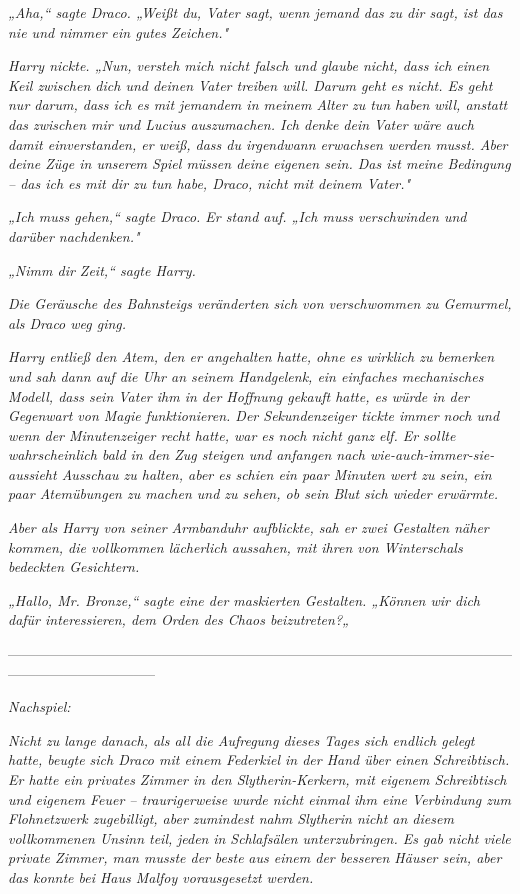 {\emph{„Aha,“ sagte Draco. „Weißt du, Vater sagt, wenn jemand das zu dir sagt, ist das nie und nimmer ein gutes Zeichen."}

\emph{Harry nickte. „Nun, versteh mich nicht falsch und glaube nicht, dass ich einen Keil zwischen dich und deinen Vater treiben will. Darum geht es nicht. Es geht nur darum, dass ich es mit jemandem in meinem Alter zu tun} \emph{haben will, anstatt das zwischen mir und Lucius auszumachen. Ich denke dein Vater wäre auch damit einverstanden, er weiß, dass du irgendwann erwachsen werden musst. Aber deine Züge in unserem Spiel müssen deine eigenen sein. Das ist meine Bedingung -- das ich es mit dir zu tun habe, Draco, nicht mit deinem Vater."}

\emph{„Ich muss gehen,“ sagte Draco. Er stand auf. „Ich muss verschwinden und darüber nachdenken."}

\emph{„Nimm dir Zeit,“ sagte Harry.}

\emph{Die Geräusche des Bahnsteigs veränderten sich von verschwommen zu Gemurmel, als Draco weg ging.}

\emph{Harry entließ den Atem, den er angehalten hatte, ohne es wirklich zu bemerken und sah dann auf die Uhr an seinem Handgelenk, ein einfaches mechanisches Modell, dass sein Vater ihm in der Hoffnung gekauft hatte, es würde in der Gegenwart von Magie funktionieren. Der Sekundenzeiger tickte immer noch und wenn der Minutenzeiger recht hatte, war es noch nicht ganz elf. Er sollte wahrscheinlich bald in den Zug steigen und anfangen nach wie-auch-immer-sie-aussieht Ausschau zu halten, aber es schien ein paar Minuten wert zu sein, ein paar Atemübungen zu machen und zu sehen, ob sein Blut sich wieder erwärmte.}

\emph{Aber als Harry von seiner Armbanduhr aufblickte, sah er zwei Gestalten näher kommen, die vollkommen lächerlich aussahen, mit ihren von Winterschals bedeckten Gesichtern.}

\emph{„Hallo, Mr. Bronze,“ sagte eine der maskierten Gestalten. „Können wir dich dafür interessieren, dem Orden des Chaos beizutreten?„}

--------------------------------------------------------------------------------------------------------------------------------------------

\hfill\break \emph{Nachspiel:}

\emph{Nicht zu lange danach, als all die Aufregung dieses Tages sich endlich gelegt hatte, beugte sich Draco mit einem Federkiel in der Hand über einen Schreibtisch. Er hatte ein privates Zimmer in den Slytherin-Kerkern, mit eigenem Schreibtisch und eigenem Feuer -- traurigerweise wurde nicht einmal ihm eine Verbindung zum Flohnetzwerk zugebilligt, aber zumindest nahm Slytherin nicht an diesem vollkommenen Unsinn teil,} \emph{\emph{jeden}} \emph{in Schlafsälen unterzubringen. Es gab nicht viele private Zimmer, man musste der} \emph{\emph{beste}} \emph{aus einem der besseren Häuser sein, aber das konnte bei Haus Malfoy vorausgesetzt werden.}

}
